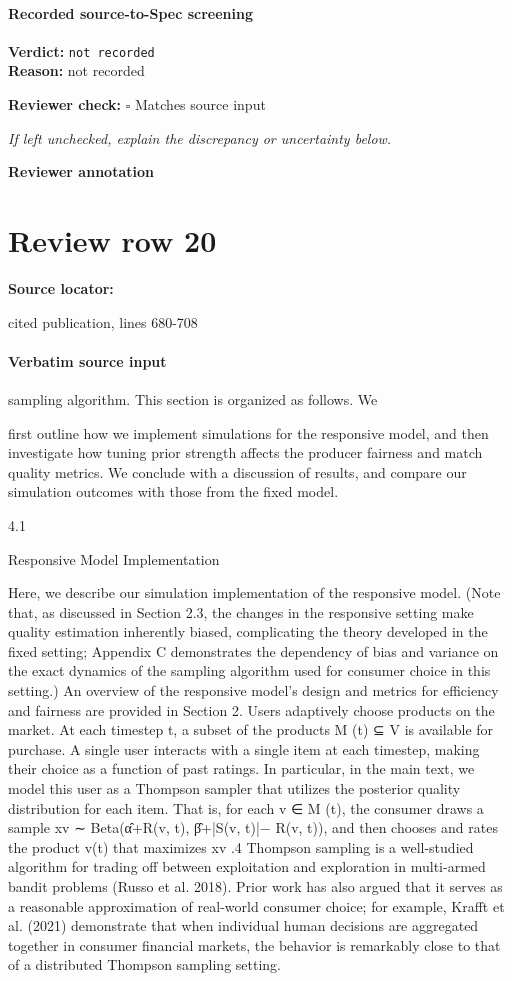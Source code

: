 \documentclass[10pt]{article}
\newcommand{\reviewerbox}{%
  \par\noindent\fbox{\parbox{0.96\linewidth}{\rule{0pt}{0.38in}}}\par
}
\newcommand{\reviewmatch}[1]{%
  \par\noindent\textbf{Reviewer check:} $\square$\; #1\par
  \noindent\emph{If left unchecked, explain the discrepancy or uncertainty below.}\par
}
\begin{document}
\paragraph{Recorded source-to-Spec screening}
\textbf{Verdict:} \texttt{not recorded}
\\
\textbf{Reason:} not recorded
\reviewmatch{Matches source input}
\noindent\textbf{Reviewer annotation}\par
\reviewerbox
\clearpage
\hypertarget{source-claim-f5087ebba0ec2e7e}{}
\section*{Review row 20}
\textbf{Source locator:} {\footnotesize\raggedright cited publication, lines 680-\allowbreak{}708\par}
\paragraph{Verbatim source input}
\begin{ReviewVerbatim}
sampling algorithm. This section is organized as follows. We

first outline how we implement simulations for the responsive model, and then investigate how tuning prior strength
affects the producer fairness and match quality metrics. We
conclude with a discussion of results, and compare our simulation outcomes with those from the fixed model.

4.1

Responsive Model Implementation

Here, we describe our simulation implementation of the responsive model. (Note that, as discussed in Section 2.3, the
changes in the responsive setting make quality estimation
inherently biased, complicating the theory developed in the
fixed setting; Appendix C demonstrates the dependency of
bias and variance on the exact dynamics of the sampling
algorithm used for consumer choice in this setting.) An
overview of the responsive model’s design and metrics for
efficiency and fairness are provided in Section 2.
Users adaptively choose products on the market. At
each timestep t, a subset of the products M (t) ⊆ V is available for purchase. A single user interacts with a single item
at each timestep, making their choice as a function of past
ratings. In particular, in the main text, we model this user as
a Thompson sampler that utilizes the posterior quality distribution for each item. That is, for each v ∈ M (t), the consumer draws a sample xv ∼ Beta(α̂+R(v, t), β̂+|S(v, t)|−
R(v, t)), and then chooses and rates the product v(t) that
maximizes xv .4 Thompson sampling is a well-studied algorithm for trading off between exploitation and exploration
in multi-armed bandit problems (Russo et al. 2018). Prior
work has also argued that it serves as a reasonable approximation of real-world consumer choice; for example, Krafft
et al. (2021) demonstrate that when individual human decisions are aggregated together in consumer financial markets, the behavior is remarkably close to that of a distributed
Thompson sampling setting.
\end{ReviewVerbatim}
\end{document}
